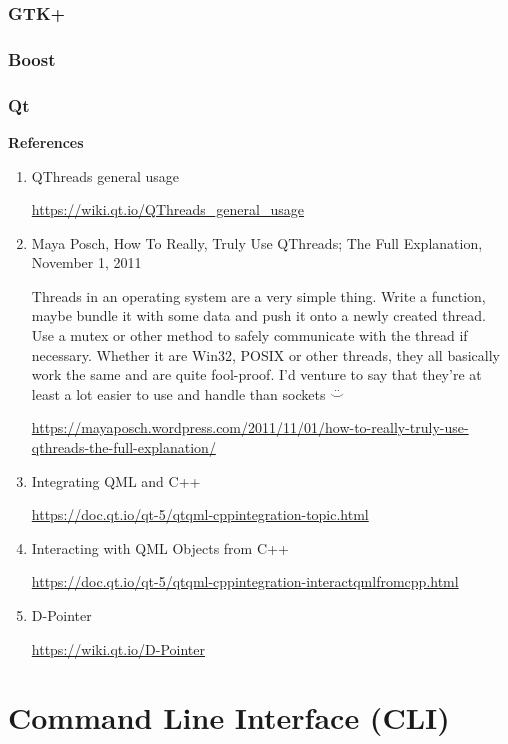 \documentclass[12pt,a4paper]{article}
\begin{document}
\subsubsection{GTK+}

\subsubsection{Boost}

\subsubsection{Qt}

\textbf{References}

\begin{enumerate}
\item QThreads general usage

	\url{https://wiki.qt.io/QThreads_general_usage}

\item Maya Posch, How To Really, Truly Use QThreads; The Full
      Explanation, November 1, 2011

    Threads in an operating system are a very simple thing. Write a function, 
    maybe bundle it with some data and push it onto a newly created thread.  
    Use a mutex or other method to safely communicate with the thread if 
    necessary.  Whether it are Win32, POSIX or other threads, they all 
    basically work the same and are quite fool-proof. I’d venture to say that 
    they’re at least a lot easier to use and handle than sockets \Smiley 
    $\stackrel{..}{\smallsmile}$

	\small
    \url{https://mayaposch.wordpress.com/2011/11/01/how-to-really-truly-use-qthreads-the-full-explanation/}

\item Integrating QML and C++

	\url{https://doc.qt.io/qt-5/qtqml-cppintegration-topic.html}

\item Interacting with QML Objects from C++

	\url{https://doc.qt.io/qt-5/qtqml-cppintegration-interactqmlfromcpp.html}

\item D-Pointer

	\url{https://wiki.qt.io/D-Pointer}

\end{enumerate}

\section{Command Line Interface (CLI)}
\end{document}
